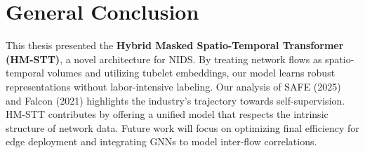 \documentclass[12pt, a4paper]{report}
\begin{document}
\part{General Conclusion}

This thesis presented the \textbf{Hybrid Masked Spatio-Temporal Transformer (HM-STT)}, a novel architecture for NIDS. By treating network flows as spatio-temporal volumes and utilizing tubelet embeddings, our model learns robust representations without labor-intensive labeling. Our analysis of SAFE (2025) and Falcon (2021) highlights the industry's trajectory towards self-supervision. HM-STT contributes by offering a unified model that respects the intrinsic structure of network data. Future work will focus on optimizing final efficiency for edge deployment and integrating GNNs to model inter-flow correlations.

\printbibliography
\end{document}
